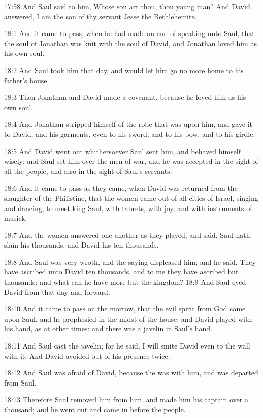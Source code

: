 17:58 And Saul said to him, Whose son art thou, thou young man? And David answered, I am the son of thy servant Jesse the Bethlehemite.

18:1 And it came to pass, when he had made an end of speaking unto Saul, that the soul of Jonathan was knit with the soul of David, and Jonathan loved him as his own soul.

18:2 And Saul took him that day, and would let him go no more home to his father's house.

18:3 Then Jonathan and David made a covenant, because he loved him as his own soul.

18:4 And Jonathan stripped himself of the robe that was upon him, and gave it to David, and his garments, even to his sword, and to his bow, and to his girdle.

18:5 And David went out whithersoever Saul sent him, and behaved himself wisely: and Saul set him over the men of war, and he was accepted in the sight of all the people, and also in the sight of Saul's servants.

18:6 And it came to pass as they came, when David was returned from the slaughter of the Philistine, that the women came out of all cities of Israel, singing and dancing, to meet king Saul, with tabrets, with joy, and with instruments of musick.

18:7 And the women answered one another as they played, and said, Saul hath slain his thousands, and David his ten thousands.

18:8 And Saul was very wroth, and the saying displeased him; and he said, They have ascribed unto David ten thousands, and to me they have ascribed but thousands: and what can he have more but the kingdom?  18:9 And Saul eyed David from that day and forward.

18:10 And it came to pass on the morrow, that the evil spirit from God came upon Saul, and he prophesied in the midst of the house: and David played with his hand, as at other times: and there was a javelin in Saul's hand.

18:11 And Saul cast the javelin; for he said, I will smite David even to the wall with it. And David avoided out of his presence twice.

18:12 And Saul was afraid of David, because the \LORD was with him, and was departed from Saul.

18:13 Therefore Saul removed him from him, and made him his captain over a thousand; and he went out and came in before the people.

